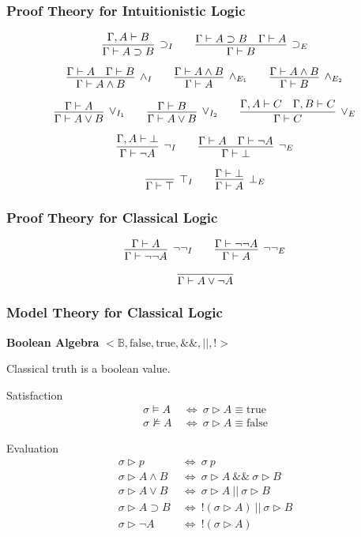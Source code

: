 \documentclass[mathserif]{beamer}
\def\true{\textrm{true}}
\def\false{\textrm{false}}
\def\imp{\supset}
\def\dfn{~\Leftrightarrow~}
\newcommand{\turn}[1]{\Gamma \vdash #1}
\newcommand{\cturn}[2]{\Gamma , #1 \vdash #2}
\newcommand{\eval}[1]{\sigma \triangleright #1}
\newcommand{\sat}[1]{\sigma \vDash #1}
\newcommand{\nsat}[1]{\sigma \nvDash #1}
\begin{document}
\begin{frame}
\frametitle{Proof Theory for Intuitionistic Logic}

$$
\infer
  [\imp_I]
  {\turn{A \imp B}}
{
  {\cturn{A}{B}}
}
\qquad
\infer
  [\imp_E]
  {\turn{B}}
{
  {\turn{A \imp B}}
  &
  {\turn{A}}
}
$$

$$
\infer
  [\land_I]
  {\turn{A \land B}}
{
  {\turn{A}}
  &
  {\turn{B}}
}
\qquad
\infer
  [\land_{E_1}]
  {\turn{A}}
{
  {\turn{A \land B}}
}
\qquad
\infer
  [\land_{E_2}]
  {\turn{B}}
{
  {\turn{A \land B}}
}
$$

$$
\infer
  [\lor_{I_1}]
  {\turn{A \lor B}}
{
  {\turn{A}}
}
\qquad
\infer
  [\lor_{I_2}]
  {\turn{A \lor B}}
{
  {\turn{B}}
}
\qquad
\infer
  [\lor_E]
  {\turn{C}}
{
  {\cturn{A}{C}}
  &
  {\cturn{B}{C}}
}
$$

$$
\infer
  [\neg_I]
  {\turn{\neg A}}
{
  {\cturn{A}{\bot}}
}
\qquad
\infer
  [\neg_E]
  {\turn{\bot}}
{
  {\turn{A}}
  &
  {\turn{\neg A}}
}
$$

$$
\infer
  [\top_I]
  {\turn{\top}}
{
}
\qquad
\infer
  [\bot_E]
  {\turn{A}}
{
  {\turn{\bot}}
}
$$

\end{frame}

\begin{frame}
\frametitle{Proof Theory for Classical Logic}


$$
\infer
  [\neg\neg_I]
  {\turn{\neg\neg A}}
{
  {\turn{A}}
}
\qquad
\infer
  [\neg\neg_E]
  {\turn{A}}
{
  {\turn{\neg\neg A}}
}
$$


$$
\infer{\turn{A \lor \neg A}}
{}
$$

\end{frame}

\begin{frame}
\frametitle{Model Theory for Classical Logic}

{\bf Boolean Algebra} $< \mathbb{B} , \false , \true , \&\& , || , ! >$

Classical truth is a boolean value.

\begin{block}{Satisfaction}
\begin{align*}
\sat{A} &\dfn \eval{A} \equiv \true\\
\nsat{A} &\dfn \eval{A} \equiv \false
\end{align*}
\end{block}

\begin{block}{Evaluation}
\begin{align*}
\eval{p} &\dfn \sigma ~ p\\
\eval{A \land B} &\dfn \eval{A} ~\&\&~ \eval{B}\\
\eval{A \lor B} &\dfn \eval{A} ~||~ \eval{B}\\
\eval{A \imp B} &\dfn ! (\eval{A}) ~||~ \eval{B}\\
\eval{\neg A} &\dfn ! (\eval{A})
\end{align*}
\end{block}

\end{frame}
\end{document}
